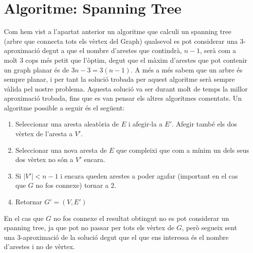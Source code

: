 \documentclass[a4paper]{article}
\begin{document}
\section{Algoritme: Spanning Tree}
Com hem vist a l'apartat anterior un algoritme que calculi un spanning tree (arbre que connecta tots els vèrtex del Graph) qualsevol es pot considerar una 3-aproximació degut a que el nombre d'arestes que contindrà, $n-1$, serà com a molt 3 cops més petit que l'òptim, degut que el màxim d'arestes que pot contenir un graph planar és de $3n - 3 = 3(n - 1)$. A més a més sabem que un arbre és sempre planar, i per tant la solució trobada per aquest algoritme serà sempre vàlida pel nostre problema. Aquesta solució va ser durant molt de temps la millor aproximació trobada, fins que es van pensar els altres algoritmes comentats.
Un algoritme possible a seguir és el següent:
\begin{enumerate}
	\item Seleccionar una aresta aleatòria de $E$ i afegir-la a $E'$. Afegir també els dos vèrtex de l'aresta a $V'$.
	\item Seleccionar una nova aresta de $E$ que compleixi que com a mínim un dels seus dos vèrtex no són a $V'$ encara.
	\item Si $|V'|<n-1$ i encara queden arestes a poder agafar (important en el cas que $G$ no fos connexe) tornar a 2.
	\item Retornar $G'=(V,E')$ 
\end{enumerate}
En el cas que $G$ no fos connexe el resultat obtingut no es pot considerar un spanning tree, ja que pot no passar per tots els vèrtex de $G$, però segueix sent una 3-aproximació de la solució degut que el que ens interessa és el nombre d'arestes i no de vèrtex. 
\printbibliography
\end{document}

